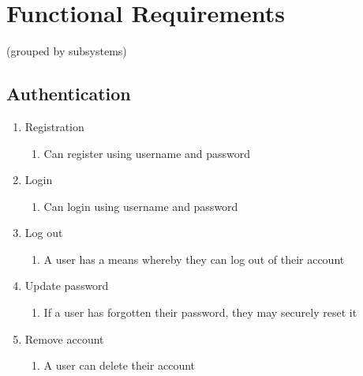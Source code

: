 \documentclass[12pt]{article}
\begin{document}
\newpage

\section{Functional Requirements}

 (grouped by subsystems)

\subsection{Authentication}
\begin{enumerate}
  \item Registration
        \begin{enumerate}
          \item Can register using username and password
        \end{enumerate}
  \item Login
        \begin{enumerate}
          \item Can login using username and password
        \end{enumerate}
  \item Log out
        \begin{enumerate}
          \item A user has a means whereby they can log out of their account
        \end{enumerate}
  \item Update password
        \begin{enumerate}
          \item If a user has forgotten their password, they may securely reset it
        \end{enumerate}
  \item Remove account
        \begin{enumerate}
          \item A user can delete their account
        \end{enumerate}
\end{enumerate}
\end{document}
